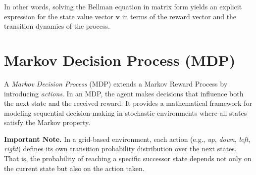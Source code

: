 \documentclass[12pt]{extreport}
\theoremstyle{definition}
\begin{document}
\noindent In other words, solving the Bellman equation in matrix form yields an explicit expression for the state value vector \( \mathbf{v} \) in terms of the reward vector and the transition dynamics of the process.

\section*{Markov Decision Process (MDP)}

A \textit{Markov Decision Process} (MDP) extends a Markov Reward Process by introducing \textit{actions}. In an MDP, the agent makes decisions that influence both the next state and the received reward. It provides a mathematical framework for modeling sequential decision-making in stochastic environments where all states satisfy the Markov property.

\bigskip

\begin{center}
\end{center}

\bigskip

\noindent\textbf{Important Note.} In a grid-based environment, each action (e.g., \textit{up}, \textit{down}, \textit{left}, \textit{right}) defines its own transition probability distribution over the next states. That is, the probability of reaching a specific successor state depends not only on the current state but also on the action taken.
\end{document}
